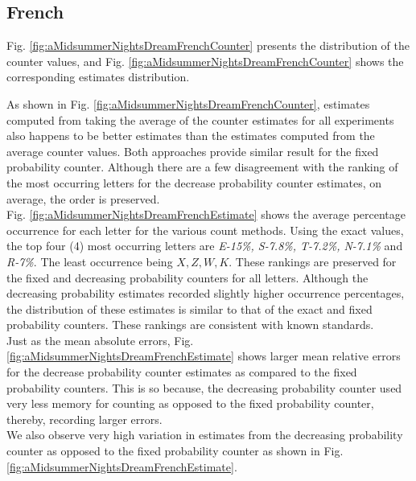 \documentclass[longpaper, english, final, times]{revdetua}
\begin{document}
			
		\subsection{French}
			Fig. \ref{fig:aMidsummerNightsDreamFrenchCounter} presents the distribution of the counter values, and Fig. \ref{fig:aMidsummerNightsDreamFrenchCounter} shows the corresponding estimates distribution. 
			
			As shown in Fig.  \ref{fig:aMidsummerNightsDreamFrenchCounter}, estimates computed from taking the average of the counter estimates for all experiments also happens to be better estimates than the estimates computed from the average counter values. Both approaches provide similar result for the fixed probability counter. 
			Although there are a few disagreement with the ranking of the most occurring letters for the decrease probability counter estimates, on average, the order is preserved.\\
			
			Fig. \ref{fig:aMidsummerNightsDreamFrenchEstimate} shows the average percentage occurrence for each letter for the various count methods. Using the exact values, the top four (4) most occurring letters are \textit{E-15\%, S-7.8\%, T-7.2\%, N-7.1\%} and \textit{R-7\%}. The least occurrence being $X, Z, W, K$. These rankings are preserved for the fixed and decreasing probability counters for all letters. Although the decreasing probability estimates recorded slightly higher occurrence percentages, the distribution of these estimates is similar to that of the exact and fixed probability counters. These rankings are consistent with known standards.\\
			
			Just as the mean absolute errors, Fig.  \ref{fig:aMidsummerNightsDreamFrenchEstimate} shows larger mean relative errors for the decrease probability counter estimates as compared to the fixed probability counters. This is so because, the decreasing probability counter used very less memory for counting as opposed to the fixed probability counter, thereby, recording larger errors. \\
			
			We also observe very high variation in estimates from the decreasing probability counter as opposed to the fixed probability counter as shown in Fig. \ref{fig:aMidsummerNightsDreamFrenchEstimate}.
		
\end{document}
